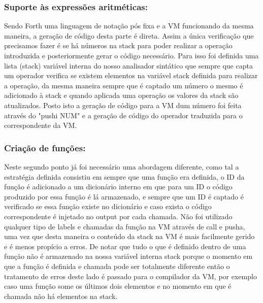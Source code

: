 \documentclass{article}
\begin{document}
\subsubsection*{Suporte às expressões aritméticas:}
    \vspace{0.5cm}
    Sendo Forth uma linguagem de notação pós fixa e a VM funcionando da mesma maneira, a geração de código desta parte é direta.
    Assim a única verificação que precisamos fazer é se há números na stack para poder realizar a operação introduzida e posteriormente gerar o código necessário. Para isso foi definida uma lista (stack) variável interna do nosso analisador sintático que sempre que capta um operador verifica se existem elementos na variável stack definida para realizar a operação, da mesma maneira sempre que é captado um número o mesmo é adicionado à stack e quando aplicada uma operação os valores da stack são atualizados.
    Posto isto a geração de código para a VM dum número foi feita através do "pushi NUM" e a geração de código do operador traduzida para o correspondente da VM. 
    \vspace{1cm}

\subsubsection*{Criação de funções:}
    \vspace{0.5cm}
    Neste segundo ponto já foi necessário uma abordagem diferente, como tal a estratégia definida consistiu em sempre que uma função era definida, o ID da função é adicionado a um dicionário interno em que para um ID o código produzido por essa função é lá armazenado, e sempre que um ID é captado é verificado se essa função existe no dicionário e caso exista o código correspondente é injetado no output por cada chamada.
    Não foi utilizado qualquer tipo de labels e chamadas da função na VM através de call e pusha, uma vez que desta maneira o conteúdo da stack na VM é mais facilmente gerido e é menos propício a erros.
    De notar que tudo o que é definido dentro de uma função não é armazenado na nossa variável interna stack porque o momento em que a função é definida e chamada pode ser totalmente diferente então o tratamento de erros deste lado é passado para o compilador da VM, por exemplo caso uma função some os últimos dois elementos e no momento em que é chamada não há elementos na stack.
    \vspace{1cm}
\end{document}
